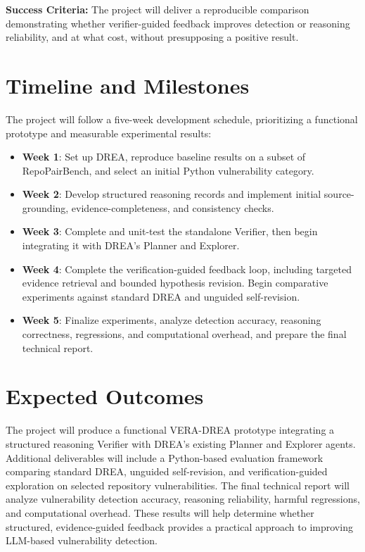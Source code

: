 \documentclass[sigconf,nonacm]{acmart}
\begin{document}
\textbf{Success Criteria:} The project will deliver a reproducible comparison demonstrating whether verifier-guided feedback improves detection or reasoning reliability, and at what cost, without presupposing a positive result.

\section{Timeline and Milestones}
The project will follow a five-week development schedule, prioritizing a functional prototype and measurable experimental results:

\begin{itemize}
    \item \textbf{Week 1}: Set up DREA, reproduce baseline results on a subset of RepoPairBench, and select an initial Python vulnerability category.

    \item \textbf{Week 2}: Develop structured reasoning records and implement initial source-grounding, evidence-completeness, and consistency checks.

    \item \textbf{Week 3}: Complete and unit-test the standalone Verifier, then begin integrating it with DREA's Planner and Explorer.

    \item \textbf{Week 4}: Complete the verification-guided feedback loop, including targeted evidence retrieval and bounded hypothesis revision. Begin comparative experiments against standard DREA and unguided self-revision.

    \item \textbf{Week 5}: Finalize experiments, analyze detection accuracy, reasoning correctness, regressions, and computational overhead, and prepare the final technical report.
\end{itemize}

\section{Expected Outcomes}
The project will produce a functional VERA-DREA prototype integrating a structured reasoning Verifier with DREA's existing Planner and Explorer agents. Additional deliverables will include a Python-based evaluation framework comparing standard DREA, unguided self-revision, and verification-guided exploration on selected repository vulnerabilities. The final technical report will analyze vulnerability detection accuracy, reasoning reliability, harmful regressions, and computational overhead. These results will help determine whether structured, evidence-guided feedback provides a practical approach to improving LLM-based vulnerability detection.
\end{document}
